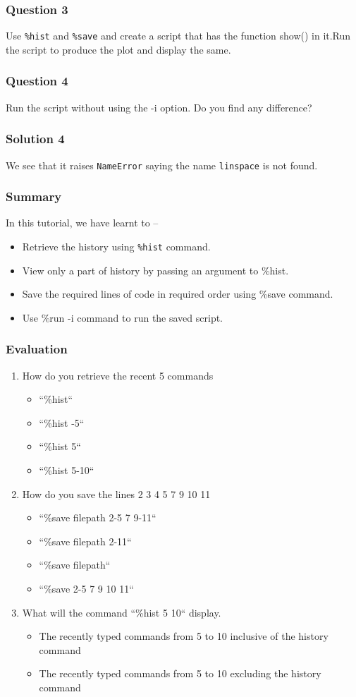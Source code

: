 \documentclass[presentation]{beamer}
\begin{document}
\begin{frame}
\frametitle{Question 3}
\label{sec-5}

  Use \texttt{\%hist} and \texttt{\%save} and create a script that has the function show()
  in it.Run the script to produce the plot and display the same.
\end{frame}
\begin{frame}
\frametitle{Question 4}
\label{sec-6}

  Run the script without using the -i option. Do you find any
  difference?
\end{frame}
\begin{frame}
\frametitle{Solution 4}
\label{sec-7}

  We see that it raises \verb~NameError~ saying the name \verb~linspace~ is not
  found.
\end{frame}
\begin{frame}
\frametitle{Summary}
\label{sec-8}

  In this tutorial, we have learnt to –

\begin{itemize}
\item Retrieve the history using \texttt{\%hist} command.
\item View only a part of history by passing an argument to \%hist.
\item Save the required lines of code in required order using \%save command.
\item Use \%run -i command to run the saved script.
\end{itemize}
\end{frame}
\begin{frame}
\frametitle{Evaluation}
\label{sec-9}


\begin{enumerate}
\item How do you retrieve the recent 5 commands
\begin{itemize}
\item ``\%hist``
\item ``\%hist -5``
\item ``\%hist 5``
\item ``\%hist 5-10``
\end{itemize}
\item How do you save the lines 2 3 4 5 7 9 10 11
\begin{itemize}
\item ``\%save filepath 2-5 7 9-11``
\item ``\%save filepath 2-11``
\item ``\%save filepath``
\item ``\%save 2-5 7 9 10 11``
\end{itemize}
\item What will the command ``\%hist 5 10`` display.
\begin{itemize}
\item The recently typed commands from 5 to 10 inclusive of 
      the history command
\item The recently typed commands from 5 to 10 excluding 
      the history command
\end{itemize}
\end{enumerate}
\end{frame}
\end{document}
